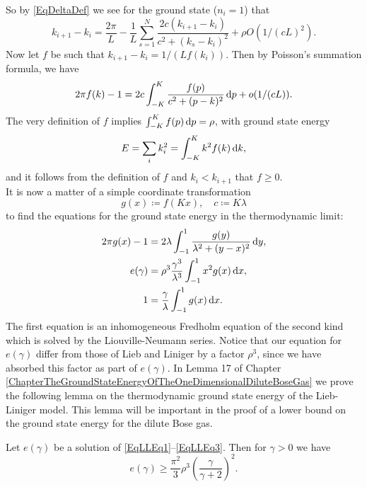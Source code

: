 So by \eqref{EqDeltaDef} we see for the ground state ($ n_i=1 $) that \begin{equation}
k_{i+1}-k_i=\frac{2\pi}{L}-\frac{1}{L}\sum_{s=1}^{N}\frac{2c(k_{i+1}-k_i)}{c^2+(k_s-k_i)^2}+\rho O(1/(cL)^2).
\end{equation}
Now let $ f $ be such that $ k_{i+1}-k_i=1/(Lf(k_i)) $. Then by Poisson's summation formula, we have \begin{equation}
2\pi f(k)-1=2c\int_{-K}^{K}\frac{f(p)}{c^2+(p-k)^2}\mathop{}\!\mathrm{d} p+o(1/(cL)).
\end{equation}
The very definition of $ f $ implies $ \int_{-K}^{K}f(p)\mathop{}\!\mathrm{d} p=\rho $, with ground state energy\begin{equation}
E=\sum_{i}k_i^2=\int_{-K}^{K}k^2f(k)\mathop{}\!\mathrm{d} k,
\end{equation} 
and it follows from the definition of $ f $ and $ k_i<k_{i+1} $ that $ f\geq 0 $.\\
It is now a matter of a simple coordinate transformation\begin{equation}
g(x)\coloneqq f(Kx),\quad  c\coloneqq K\lambda
\end{equation}
to find the equations for the ground state energy in the thermodynamic limit:
\begin{align}
2\pi g(x)-1&=2\lambda\int_{-1}^{1}\frac{g(y)}{\lambda^2+(y-x)^2}\mathop{}\!\mathrm{d} y\label{EqLLEq1},\\
e(\gamma)&=\rho^3\frac{\gamma^3}{\lambda^3}\int_{-1}^{1}x^2 g(x)\mathop{}\!\mathrm{d} x\label{EqLLEq2},\\
1&=\frac{\gamma}{\lambda}\int_{-1}^{1}g(x)\mathop{}\!\mathrm{d} x.\label{EqLLEq3}
\end{align}
The first equation is an inhomogeneous Fredholm equation of the second kind which is solved by the Liouville-Neumann series. Notice that our equation for  $ e(\gamma) $ differ from those of Lieb and Liniger by a factor $ \rho^3 $, since we have absorbed this factor as part of $ e(\gamma) $. In Lemma 17 of Chapter \ref{ChapterTheGroundStateEnergyOfTheOneDimensionalDiluteBoseGas} we prove the following lemma on the thermodynamic ground state energy of the Lieb-Liniger model. This lemma will be important in the proof of a lower bound on the ground state energy for the dilute Bose gas.
\begin{lemma}
	Let $ e(\gamma) $ be a solution of \eqref{EqLLEq1}--\eqref{EqLLEq3}. Then for $ \gamma>0 $ we have \begin{equation}
	e(\gamma)\geq \frac{\pi^2}{3}\rho^3\left(\frac{\gamma}{\gamma+2}\right)^2.
	\end{equation}
\end{lemma}

